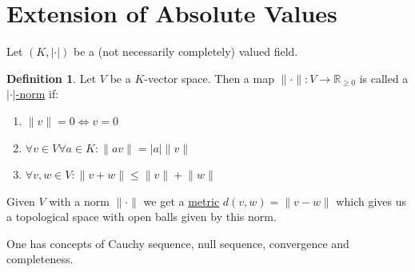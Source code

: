 \documentclass[openany]{amsbook}
\numberwithin{section}{chapter}
\theoremstyle{definition}
\newtheorem*{definition}{Definition}
\begin{document}
\section{Extension of Absolute Values}

Let \((K, \vert \cdot \vert)\) be a (not necessarily completely) valued field.

\begin{definition}
    Let \(V\) be a \(K\)-vector space. Then a map \(\lVert \cdot \rVert : V \to \mathbb{R}_{\geq 0}\) is called a \underline{\(\vert \cdot \vert\)-norm} if:
    
    \begin{enumerate}[label=\roman*)]
        \item \(\lVert v \rVert = 0 \iff v = 0\) 
        \item \(\forall v\in V \forall a\in K: \lVert av \rVert = \vert a \vert \lVert v \rVert \) 
        \item \(\forall v,w \in V: \lVert v+w \rVert \leq \lVert v \rVert + \lVert w \rVert\)  
    \end{enumerate} 

    Given \(V\) with a norm \(\lVert \cdot \rVert \) we get a \underline{metric} \(d(v,w) = \lVert v-w \rVert \) which gives us a topological space with open balls given by this norm.
\end{definition}

One has concepts of Cauchy sequence, null sequence, convergence and completeness.
\end{document}
